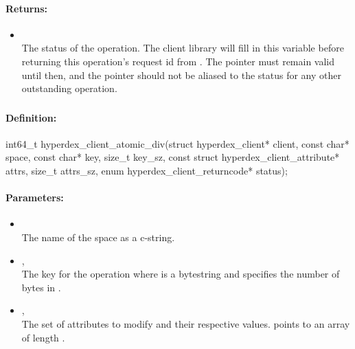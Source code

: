 \paragraph{Returns:}
\begin{itemize}[noitemsep]
\item {}\\
The status of the operation.  The client library will fill in this variable before returning this operation's request id from .  The pointer must remain valid until then, and the pointer should not be aliased to the status for any other outstanding operation.
\end{itemize}

\pagebreak
\subsubsection{}
\label{api:c:atomic_div}


\paragraph{Definition:}
\begin{ccode}
int64_t hyperdex_client_atomic_div(struct hyperdex_client* client,
        const char* space,
        const char* key, size_t key_sz,
        const struct hyperdex_client_attribute* attrs, size_t attrs_sz,
        enum hyperdex_client_returncode* status);
\end{ccode}

\paragraph{Parameters:}
\begin{itemize}[noitemsep]
\item {}\\
The name of the space as a c-string.
\item {}, \\
The key for the operation where  is a bytestring and  specifies the number of bytes in .
\item {}, \\
The set of attributes to modify and their respective values.   points to an array of length .
\end{itemize}

